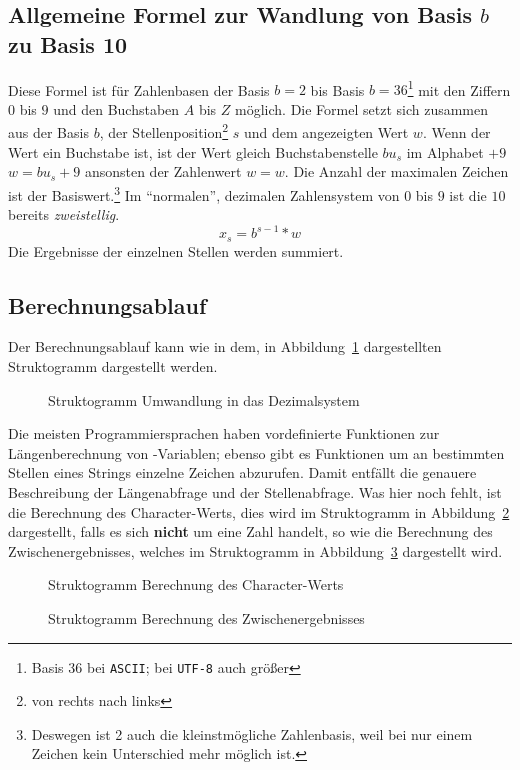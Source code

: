 \documentclass[a4paper,12pt,twoside]{book}
\begin{document}
\subsection{Allgemeine Formel zur Wandlung von Basis $b$ zu Basis 10}
Diese Formel ist für Zahlenbasen der Basis $b=2$ bis Basis $b=36$\footnote{Basis 36 bei \texttt{ASCII}; bei \texttt{UTF-8} auch größer} mit den Ziffern $0$ bis $9$ und den Buchstaben $A$ bis $Z$ möglich.
Die Formel setzt sich zusammen aus der Basis $b$, der Stellenposition\footnote{von rechts nach links} $s$ und dem angezeigten Wert $w$.
Wenn der Wert ein Buchstabe ist, ist der Wert gleich Buchstabenstelle $bu_{s}$ im Alphabet $ + 9$ \(w = bu_{s} + 9\) ansonsten der Zahlenwert \(w = w\). 
Die Anzahl der maximalen Zeichen ist der Basiswert.\footnote{Deswegen ist 2 auch die kleinstmögliche Zahlenbasis, weil bei nur einem Zeichen kein Unterschied mehr möglich ist.}  
Im "`normalen"', dezimalen Zahlensystem von $0$ bis $9$ ist die $10$ bereits \textit{zweistellig}.
\begin{equation}
x_{s} = b^{s - 1} * w
\label{eq:b-10}
\end{equation}
Die Ergebnisse der einzelnen Stellen werden summiert.

\subsection{Berechnungsablauf}
Der Berechnungsablauf kann wie in dem, in Abbildung~\ref{fig:struct1} dargestellten Struktogramm dargestellt werden.
\begin{figure}
		
	\caption{Struktogramm Umwandlung in das Dezimalsystem}
	\label{fig:struct1}
\end{figure}
Die meisten Programmiersprachen haben vordefinierte Funktionen zur Längenberechnung von -Variablen; ebenso gibt es Funktionen um an bestimmten Stellen eines Strings einzelne Zeichen abzurufen.
Damit entfällt die genauere Beschreibung der Längenabfrage und der Stellenabfrage.
Was hier noch fehlt, ist die Berechnung des Character-Werts, dies wird im Struktogramm in Abbildung~\ref{fig:struct1b} dargestellt, falls es sich \textbf{nicht} um eine Zahl handelt, so wie die Berechnung des Zwischenergebnisses, welches im Struktogramm in Abbildung~\ref{fig:struct1c} dargestellt wird.
\begin{figure}
	
	\caption{Struktogramm Berechnung des Character-Werts}
	\label{fig:struct1b}
\end{figure}
\begin{figure}
	
	\caption{Struktogramm Berechnung des Zwischenergebnisses}
	\label{fig:struct1c}
\end{figure}
\end{document}
